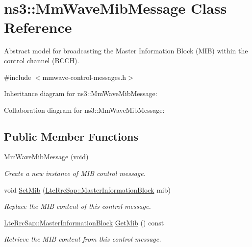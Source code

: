 \hypertarget{classns3_1_1MmWaveMibMessage}{}\section{ns3\+:\+:Mm\+Wave\+Mib\+Message Class Reference}
\label{classns3_1_1MmWaveMibMessage}


Abstract model for broadcasting the Master Information Block (M\+IB) within the control channel (B\+C\+CH).  




{\ttfamily \#include $<$mmwave-\/control-\/messages.\+h$>$}



Inheritance diagram for ns3\+:\+:Mm\+Wave\+Mib\+Message\+:


Collaboration diagram for ns3\+:\+:Mm\+Wave\+Mib\+Message\+:
\subsection*{Public Member Functions}
\begin{DoxyCompactItemize}
\item 
\hyperlink{classns3_1_1MmWaveMibMessage_a2cc07262b9b6984485edbf1fc98427cf}{Mm\+Wave\+Mib\+Message} (void)
\begin{DoxyCompactList}\small\item\em Create a new instance of M\+IB control message. \end{DoxyCompactList}\item 
void \hyperlink{classns3_1_1MmWaveMibMessage_aafcb74b9711b7e7da4699b6c416dad12}{Set\+Mib} (\hyperlink{structns3_1_1LteRrcSap_1_1MasterInformationBlock}{Lte\+Rrc\+Sap\+::\+Master\+Information\+Block} mib)
\begin{DoxyCompactList}\small\item\em Replace the M\+IB content of this control message. \end{DoxyCompactList}\item 
\hyperlink{structns3_1_1LteRrcSap_1_1MasterInformationBlock}{Lte\+Rrc\+Sap\+::\+Master\+Information\+Block} \hyperlink{classns3_1_1MmWaveMibMessage_a6c7a44045874d98b9faa8531f755c935}{Get\+Mib} () const 
\begin{DoxyCompactList}\small\item\em Retrieve the M\+IB content from this control message. \end{DoxyCompactList}\end{DoxyCompactItemize}
